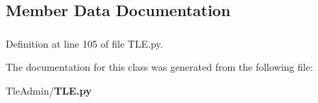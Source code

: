 \subsection{\-Member \-Data \-Documentation}
\subsubsection[{v}]{}\label{class_tle_admin_1_1_t_l_e_1_1_tle_adbb8b938b89cd364da35caa218fb3dc8}


\-Definition at line 105 of file \-T\-L\-E.\-py.



\-The documentation for this class was generated from the following file\-:\begin{DoxyCompactItemize}
\item 
\-Tle\-Admin/{\bf \-T\-L\-E.\-py}\end{DoxyCompactItemize}
